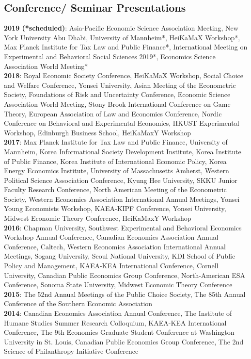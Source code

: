 \documentclass[margin, letterpaper]{res}
\begin{document}
\begin{resume}
\section{Conference/ Seminar Presentations}
\textbf{2019 (*scheduled)}: Asia-Pacific Economic Science Association Meeting, New York University Abu Dhabi, University of Mannheim*, HeiKaMaX Workshop*, Max Planck Institute for Tax Law and Public Finance*, International Meeting on Experimental and Behavioral Social Sciences 2019*, Economics Science Association World Meeting*\\
\textbf{2018}: Royal Economic Society Conference, HeiKaMaX Workshop, Social Choice and Welfare Conference, Yonsei University, Asian Meeting of the Econometric Society, Foundations of Risk and Uncertainty Conference, Economic Science Association World Meeting, Stony Brook International Conference on Game Theory, European Association of Law and Economics Conference, Nordic Conference on Behavioral and Experimental Economics, HKUST Experimental Workshop, Edinburgh Business School, HeiKaMaxY Workshop\\
\textbf{2017}: Max Planck Institute for Tax Law and Public Finance, University of Mannheim, Korea Informational Society Development Institute, Korea Institute of Public Finance, Korea Institute of International Economic Policy, Korea Energy Economics Institute, University of Massachusetts Amherst, Western Political Science Association Conference, Kyung Hee University, SKKU Junior Faculty Research Conference, North American Meeting of the Econometric Society, Western Economics Association International Annual Meetings, Yonsei Young Economists Workshop, KAEA-KIPF Conference, Yonsei University, Midwest Economic Theory Conference, HeiKaMaxY Workshop\\
\textbf{2016}: Chapman University, Southwest Experimental and Behavioral Economics Workshop Annual Conference, Canadian Economics Association Annual Conference, Caltech, Western Economics Association International Annual Meetings, Sogang University, Seoul National University, KDI School of Public Policy and Management, KAEA-KEA International Conference, Cornell University, Canadian Public Economics Group Conference, North-American ESA Conference, Sonoma State University, Midwest Economic Theory Conference\\
\textbf{2015}: The 52nd Annual Meetings of the Public Choice Society, The 85th Annual Conference of the Southern Economic Association\\
\textbf{2014}: Canadian Economics Association Annual Conference, The Institute of Humane Studies Summer Research Colloquium, KAEA-KEA International Conference, The 9th Economics Graduate Student Conference at Washington University in St. Louis, Canadian Public Economics Group Conference, The 2nd Science of Philanthropy Initiative Conference


\end{resume}
\end{document}
